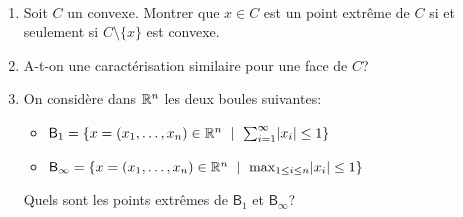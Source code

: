 \begin{td-exo}\ %
	\begin{enumerate}
		\item Soit \(C\) un convexe. Montrer que \(x\in C\) est un point extrême de \(C\)
		si et seulement si \(C\setminus\{x\}\) est convexe.

		\item A-t-on une caractérisation similaire pour une face de \(C\)?

		\item On considère dans \(\mathbb{R}^n\) les deux boules suivantes:
		\begin{itemize}
			\item \(\mathsf{B}_1=\{x = (x_1,\ldots,x_n)\in \mathbb{R}^n\ \mid\ \sum_{i=1}^\infty \mathopen{}\left|x_i\right|\mathclose{} \leq 1\}\)
			\item \(\mathsf{B}_\infty = \{x = (x_1,\ldots,x_n)\in \mathbb{R}^n\ \mid\ \max_{1\leq i\leq n} \mathopen{}\left|x_i\right|\mathclose{} \leq 1\}\)
		\end{itemize}
		Quels sont les points extrêmes de \(\mathsf{B}_1\) et \(\mathsf{B}_\infty\)?
	\end{enumerate}
\end{td-exo}

